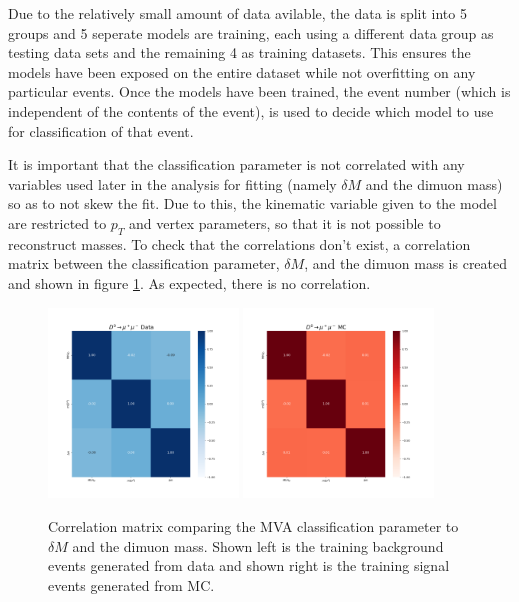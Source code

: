 Due to the relatively small amount of data avilable, the data is split into 5 groups and 5 seperate models are training, each using a different data group as testing data sets and the remaining 4 as training datasets. This ensures the models have been exposed on the entire dataset while not overfitting on any particular events. Once the models have been trained, the event number (which is independent of the contents of the event), is used to decide which model to use for classification of that event. 

It is important that the classification parameter is not correlated with any variables used later in the analysis for fitting (namely $\delta M$ and the dimuon mass) so as to not skew the fit. Due to this, the kinematic variable given to the model are restricted to $p_T$ and vertex parameters, so that it is not possible to reconstruct masses. To check that the correlations don't exist, a correlation matrix between the classification parameter, $\delta M$, and the dimuon mass is created and shown in figure \ref{fig:mva_correlation_matrix_for_fit_variables}. As expected, there is no correlation.


\begin{figure}[htp]
    \begin{center}
      \includegraphics[width=0.45\textwidth]{figures/chapter4/mva/Correlation_data_obs.png}
      \includegraphics[width=0.45\textwidth]{figures/chapter4/mva/Correlation_dmm_obs.png}\\
    \end{center}
    \caption{
      Correlation matrix comparing the MVA classification parameter to $\delta M$ and the dimuon mass. Shown left is the training background events generated from data and shown right is the training signal events generated from MC.
    }
    \label{fig:mva_correlation_matrix_for_fit_variables}
\end{figure}

